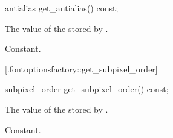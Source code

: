 %
%
\begin{itemdecl}
antialias get_antialias() const;
\end{itemdecl}
\begin{itemdescr}
	\pnum
	\returns
	The value of the  stored by .
	
	\pnum
	\complexity
	Constant.
\end{itemdescr}

 [\iotwod.fontoptionsfactory::get_subpixel_order] 
{}

%
%
\begin{itemdecl}
subpixel_order get_subpixel_order() const;
\end{itemdecl}
\begin{itemdescr}
	\pnum
	\returns
	The value of the  stored by .
	
	\pnum
	\complexity
	Constant.
\end{itemdescr}
